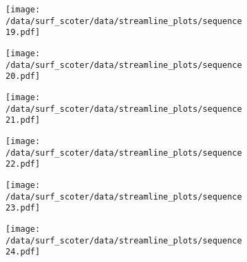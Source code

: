 \begin{figure}[h]
	\begin{subfigure}[t]{0.5\textwidth}
		\centering
		\texttt{[image: /data/surf\_scoter/data/streamline\_plots/sequence19.pdf]}
	\end{subfigure}%
	\begin{subfigure}[t]{0.5\textwidth}
		\centering
		\texttt{[image: /data/surf\_scoter/data/streamline\_plots/sequence20.pdf]}
	\end{subfigure}
	\begin{subfigure}[t]{0.5\textwidth}
		\centering
		\texttt{[image: /data/surf\_scoter/data/streamline\_plots/sequence21.pdf]}
	\end{subfigure}%
	\begin{subfigure}[t]{0.5\textwidth}
		\centering
		\texttt{[image: /data/surf\_scoter/data/streamline\_plots/sequence22.pdf]}
	\end{subfigure}
	\begin{subfigure}[t]{0.5\textwidth}
		\centering
		\texttt{[image: /data/surf\_scoter/data/streamline\_plots/sequence23.pdf]}
	\end{subfigure}%
	\begin{subfigure}[t]{0.5\textwidth}
		\centering
		\texttt{[image: /data/surf\_scoter/data/streamline\_plots/sequence24.pdf]}
	\end{subfigure}
\end{figure}
